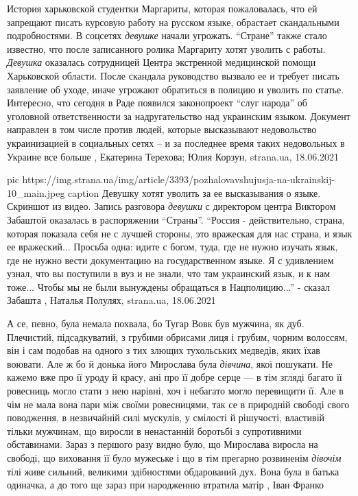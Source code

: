 История харьковской студентки Маргариты, которая пожаловалась, что ей запрещают
писать курсовую работу на русском языке, обрастает скандальными подробностями.
В соцсетях \emph{девушке} начали угрожать. \enquote{Стране} также стало известно, что после
записанного ролика Маргариту хотят уволить с работы.  \emph{Девушка} оказалась
сотрудницей Центра экстренной медицинской помощи Харьковской области. После
скандала руководство вызвало ее и требует писать заявление об уходе, иначе
угрожают обратиться в полицию и уволить по статье.  Интересно, что сегодня в
Раде появился законопроект \enquote{слуг народа} об уголовной ответственности за
надругательство над украинским языком. Документ направлен в том числе против
людей, которые высказывают недовольство украинизацией в социальных сетях – и за
последнее время таких недовольных в Украине все больше
, 
Екатерина Терехова; Юлия Корзун, strana.ua, 18.06.2021

\ifcmt
  pic https://img.strana.ua/img/article/3393/pozhalovavshujusja-na-ukrainskij-10_main.jpeg
	caption Девушку хотят уволить за ее высказывания о языке. Скриншот из видео.
\fi
Запись разговора \emph{девушки} с директором центра Виктором Забаштой оказалась в
распоряжении \enquote{Страны}.  \enquote{Россия - действительно, страна,
которая показала себя не с лучшей стороны, это вражеская для нас страна, и язык
ее вражеский...  Просьба одна: идите с богом, туда, где не нужно изучать язык,
где не нужно вести документацию на государственном языке. Я с удивлением узнал,
что вы поступили в вуз и не знали, что там украинский язык, и к нам тоже...
Чтобы мы не были вынуждены обращаться в Нацполицию...} - сказал Забашта
, 
Наталья Полулях, strana.ua, 18.06.2021

А се, певно, була немала похвала, бо Тугар Вовк був мужчина, як дуб. Плечистий,
підсадкуватий, з грубими обрисами лиця і грубим, чорним волоссям, він і сам
подобав на одного з тих злющих тухольських медведів, яких їхав воювати. Але ж
бо й донька його Мирослава була \emph{дівчина}, якої пошукати. Не кажемо вже про її
уроду й красу, ані про її добре серце — в тім згляді багато її ровесниць могло
стати з нею нарівні, хоч і небагато могло перевищити її. Але в чім не мала вона
пари між своїми ровесницями, так се в природній свободі свого поводження, в
незвичайній силі мускулів, у смілості й рішучості, властивій тільки мужчинам,
що виросли в ненастанній боротьбі з супротивними обставинами. Зараз з першого
разу видно було, що Мирослава виросла на свободі, що виховання її було мужеське
і що в тім прегарно розвиненім \emph{дівочім} тілі живе сильний, великими здібностями
обдарований дух. Вона була в батька одиначка, а до того ще зараз при народженню
втратила матір
, Іван Франко

